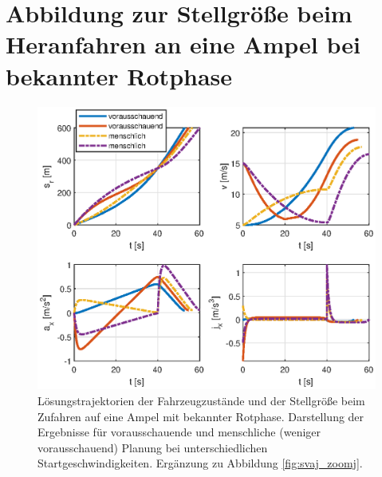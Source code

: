 \chapter{Abbildung zur Stellgröße beim Heranfahren an eine Ampel bei bekannter Rotphase}\label{app:Stellgr}
\begin{figure}[h] 
	\centering
	\includegraphics[width=\linewidth]{./Bilder/Ergebnisse/Geradeausfahrt/Ampel/v_5_v_15/svaj.eps}
	\caption{Lösungstrajektorien der Fahrzeugzustände und der Stellgröße beim Zufahren auf eine Ampel mit bekannter Rotphase. Darstellung der Ergebnisse für vorausschauende und menschliche (weniger vorausschauend) Planung bei unterschiedlichen Startgeschwindigkeiten. Ergänzung zu Abbildung \ref{fig:svaj_zoomj}.}
	\label{fig:svaj}
\end{figure} 
